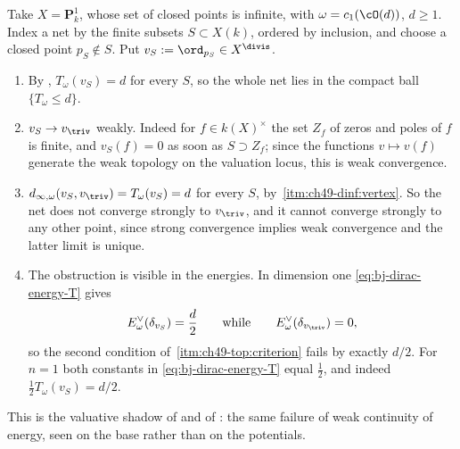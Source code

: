 \begin{example}
\label{ex:ch49-weak-not-strong}
Take $X=\mathbf P^1_k$, whose set of closed points is infinite, with
$\omega=c_1(\cO(d))$, $d\ge1$.  Index a net by the finite subsets
$S\subset X(k)$, ordered by inclusion, and choose a closed point
$p_S\notin S$.  Put $v_S:=\ord_{p_S}\in X^{\divis}$.
\begin{enumerate}
\item\label{itm:ch49-wns:ball}
      By , $T_\omega(v_S)=d$ for every $S$, so
      the whole net lies in the compact ball $\{T_\omega\le d\}$.
\item\label{itm:ch49-wns:weak}
      $v_S\to v_{\triv}$ weakly.  Indeed for $f\in k(X)^\times$ the set
      $Z_f$ of zeros and poles of $f$ is finite, and $v_S(f)=0$ as
      soon as $S\supset Z_f$; since the functions $v\mapsto v(f)$
      generate the weak topology on the valuation locus, this is weak convergence.
\item\label{itm:ch49-wns:strong}
      $d_{\infty,\omega}(v_S,v_{\triv})=T_\omega(v_S)=d$ for every $S$,
      by \,\cref{itm:ch49-dinf:vertex}.  So the
      net does not converge strongly to $v_{\triv}$, and it cannot converge strongly to any other point, since strong
      convergence implies weak convergence and the latter limit is unique.
\item\label{itm:ch49-wns:energy}
      The obstruction is visible in the energies.
      In dimension one \eqref{eq:bj-dirac-energy-T} gives
      \[
       E^\vee_\omega(\delta_{v_S})=\frac d2
       \qquad\text{while}\qquad
       E^\vee_\omega(\delta_{v_{\triv}})=0 ,
      \]
      so the second condition of
      \,\cref{itm:ch49-top:criterion}
      fails by exactly $d/2$.  For $n=1$ both constants in
      \eqref{eq:bj-dirac-energy-T} equal $\tfrac12$, and indeed
      $\tfrac12T_\omega(v_S)=d/2$.
\end{enumerate}
This is the valuative shadow of 
and of : the same failure of weak continuity of
energy, seen on the base rather than on the potentials.
\end{example}

